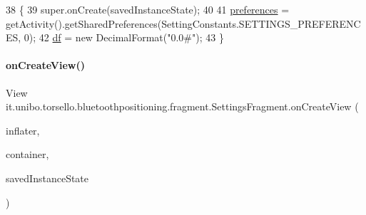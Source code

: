 \begin{DoxyCode}
38                                                     \{
39         super.onCreate(savedInstanceState);
40 
41         \hyperlink{classit_1_1unibo_1_1torsello_1_1bluetoothpositioning_1_1fragment_1_1SettingsFragment_a52480c4d5d81ca59fe4a98ae3c623ea4_a52480c4d5d81ca59fe4a98ae3c623ea4}{preferences} = getActivity().getSharedPreferences(SettingConstants.SETTINGS\_PREFERENCES, 
      0);
42         \hyperlink{classit_1_1unibo_1_1torsello_1_1bluetoothpositioning_1_1fragment_1_1SettingsFragment_af6b80a700dc80c39a56d001b68a47694_af6b80a700dc80c39a56d001b68a47694}{df} = \textcolor{keyword}{new} DecimalFormat(\textcolor{stringliteral}{"0.0#"});
43     \}
\end{DoxyCode}
\hypertarget{classit_1_1unibo_1_1torsello_1_1bluetoothpositioning_1_1fragment_1_1SettingsFragment_ac1c9d47777382cc2c74b7b1cf3d6ccd7_ac1c9d47777382cc2c74b7b1cf3d6ccd7}{}\label{classit_1_1unibo_1_1torsello_1_1bluetoothpositioning_1_1fragment_1_1SettingsFragment_ac1c9d47777382cc2c74b7b1cf3d6ccd7_ac1c9d47777382cc2c74b7b1cf3d6ccd7} 
\paragraph{\texorpdfstring{on\+Create\+View()}{onCreateView()}}
{\footnotesize\ttfamily View it.\+unibo.\+torsello.\+bluetoothpositioning.\+fragment.\+Settings\+Fragment.\+on\+Create\+View (\begin{DoxyParamCaption}\item[{Layout\+Inflater}]{inflater,  }\item[{View\+Group}]{container,  }\item[{Bundle}]{saved\+Instance\+State }\end{DoxyParamCaption})}


